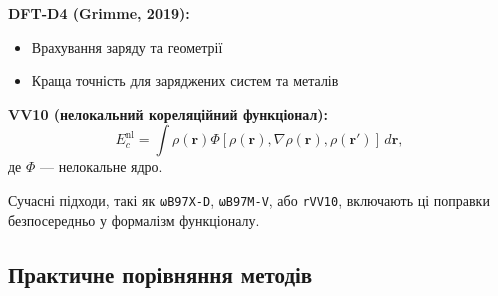 \textbf{DFT-D4 (Grimme, 2019):}
\begin{itemize}
    \item Врахування заряду та геометрії
    \item Краща точність для заряджених систем та металів
\end{itemize}

\textbf{VV10 (нелокальний кореляційний функціонал):}
\[
E_c^{\text{nl}} = \int \rho(\mathbf{r}) \Phi[\rho(\mathbf{r}), \nabla\rho(\mathbf{r}), \rho(\mathbf{r}')] \, d\mathbf{r},
\]
де \(\Phi\) --- нелокальне ядро.

Сучасні підходи, такі як \texttt{ωB97X-D}, \texttt{ωB97M-V}, або \texttt{rVV10}, включають ці поправки безпосередньо у формалізм функціоналу.

\subsection{Практичне порівняння методів}


